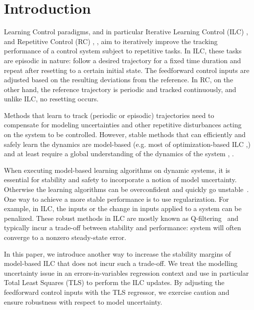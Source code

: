 \section{Introduction}

Learning Control paradigms, and in particular Iterative Learning Control (ILC) \cite{Arimoto84}, \cite{Bristow06} and Repetitive Control (RC) \cite{Wang09}, \cite{Longman2000}, aim to iteratively improve the tracking performance of a control system subject to repetitive tasks. In ILC, these tasks are episodic in nature: follow a desired trajectory for a fixed time duration and repeat after resetting to a certain initial state. The feedforward control inputs are adjusted based on the resulting deviations from the reference. In RC, on the other hand, the reference trajectory is periodic and tracked continuously, and unlike ILC, no resetting occurs.

Methods that learn to track (periodic or episodic) trajectories need to compensate for modeling uncertainties and other repetitive disturbances acting on the system to be controlled. However, stable methods that can efficiently and safely learn the dynamics are model-based (e.g. most of optimization-based ILC \cite{Amann95},\cite{Bristow06}) and at least require a global understanding of the dynamics of the system \cite{Kolter09}, \cite{NguyenTuong11}.

When executing model-based learning algorithms on dynamic systems, it is essential for stability and safety to incorporate a notion of model uncertainty. Otherwise the learning algorithms can be overconfident and quickly go unstable~\cite{Longman2000}. One way to achieve a more stable performance is to use regularization. For example, in ILC, the inputs or the change in inputs applied to a system can be penalized. These robust methods in ILC are mostly known as Q-filtering~\cite{Bristow06} and typically incur a trade-off between stability and performance: system will often converge to a nonzero steady-state error. %

In this paper, we introduce another way to increase the stability margins of model-based ILC that does not incur such a trade-off. We treat the modelling uncertainty issue in an errors-in-variables regression context and use in particular Total Least Squares (TLS) \cite{Golub80} to perform the ILC updates. By adjusting the feedforward control inputs with the TLS regressor, we exercise caution and ensure robustness with respect to model uncertainty. %

